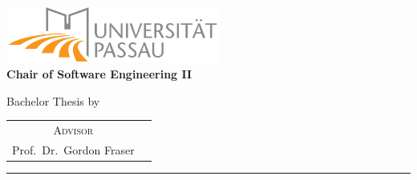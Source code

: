 \begin{titlepage}
    \centering
    \begin{onehalfspace}
    
        	\includegraphics[width=7cm]{images/uni-logo.png}\\
        	\vspace{1.0cm}
        	\large {\bfseries Chair of Software Engineering II} \\

        	\vspace{2.5cm}

            \begin{doublespace}
            	{\textsf{\Huge{\thetitle}}}
            \end{doublespace}

        	\vspace{2cm}

            \Large{Bachelor Thesis by}\\

        	\vspace{1cm}

        	{\bfseries \large{\theauthor}}

        	\vfill

        	{\large
        		\begin{tabular}[l]{cc}
        			\textsc{Advisor}\\
        			Prof.~Dr.~Gordon Fraser
        		\end{tabular}
        	}

        	\vspace{1.5cm}

        	\parbox{\linewidth}{\hrule\strut}

            \vfill

	    {\thedate}
    	
    \end{onehalfspace}
\end{titlepage}

